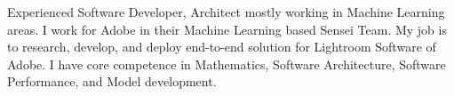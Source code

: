 \par{
Experienced Software Developer, Architect mostly working in Machine Learning areas. I work for Adobe in their Machine Learning based Sensei Team. My job is to research, develop, and deploy end-to-end solution for Lightroom Software of Adobe. I have core competence in Mathematics, Software Architecture, Software Performance, and Model development.
}